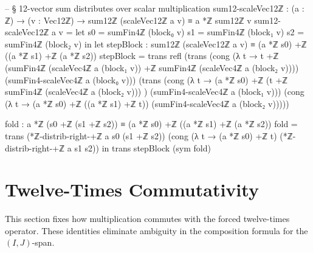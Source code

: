 \documentclass[11pt,a4paper]{book}
\begin{document}
\begin{code}
-- § 12-vector sum distributes over scalar multiplication
sum12-scaleVec12ℤ : (a : ℤ) → (v : Vec12ℤ) → sum12ℤ (scaleVec12ℤ a v) ≡ a *ℤ sum12ℤ v
sum12-scaleVec12ℤ a v =
  let
    s0 = sumFin4ℤ (block₀ v)
    s1 = sumFin4ℤ (block₁ v)
    s2 = sumFin4ℤ (block₂ v)
  in
  let
    stepBlock : sum12ℤ (scaleVec12ℤ a v) ≡ (a *ℤ s0) +ℤ ((a *ℤ s1) +ℤ (a *ℤ s2))
    stepBlock =
      trans
        refl
        (trans
          (cong
            (λ t → t +ℤ (sumFin4ℤ (scaleVec4ℤ a (block₁ v)) +ℤ sumFin4ℤ (scaleVec4ℤ a (block₂ v))))
            (sumFin4-scaleVec4ℤ a (block₀ v)))
          (trans
            (cong
              (λ t → (a *ℤ s0) +ℤ (t +ℤ sumFin4ℤ (scaleVec4ℤ a (block₂ v))) )
              (sumFin4-scaleVec4ℤ a (block₁ v)))
            (cong
              (λ t → (a *ℤ s0) +ℤ ((a *ℤ s1) +ℤ t))
              (sumFin4-scaleVec4ℤ a (block₂ v)))))

    fold : a *ℤ (s0 +ℤ (s1 +ℤ s2)) ≡ (a *ℤ s0) +ℤ ((a *ℤ s1) +ℤ (a *ℤ s2))
    fold =
      trans
        (*ℤ-distrib-right-+ℤ a s0 (s1 +ℤ s2))
        (cong (λ t → (a *ℤ s0) +ℤ t) (*ℤ-distrib-right-+ℤ a s1 s2))
  in
  trans stepBlock (sym fold)
\end{code}

\section{Twelve-Times Commutativity}

This section fixes how multiplication commutes with the forced twelve-times
operator.  These identities eliminate ambiguity in the composition formula for
the $(I,J)$-span.
\end{document}
